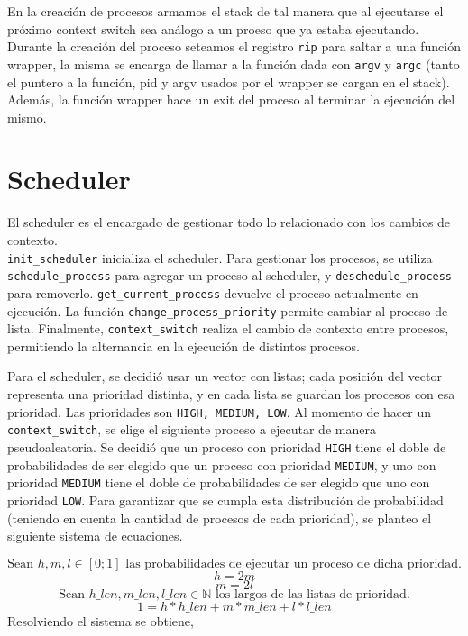 \documentclass{article}
\begin{document}
En la creación de procesos armamos el stack de tal manera que al ejecutarse el próximo context switch sea análogo a un proeso que ya estaba ejecutando. Durante la creación del proceso seteamos el registro \texttt{rip} para saltar a una función wrapper, la misma se encarga de llamar a la función dada con \texttt{argv} y \texttt{argc} (tanto el puntero a la función, pid y argv usados por el wrapper se cargan en el stack). Además, la función wrapper hace un exit del proceso al terminar la ejecución del mismo.

\section {Scheduler}
El scheduler es el encargado de gestionar todo lo relacionado con los cambios de contexto. \\ \texttt{init\_scheduler} inicializa el scheduler. Para gestionar los procesos, se utiliza \texttt{schedule\_process} para agregar un proceso al scheduler, y \texttt{deschedule\_process} para removerlo. \texttt{get\_current\_process} devuelve el proceso actualmente en ejecución. La función \texttt{change\_process\_priority} permite cambiar al proceso de lista. Finalmente, \texttt{context\_switch} realiza el cambio de contexto entre procesos, permitiendo la alternancia en la ejecución de distintos procesos.

Para el scheduler, se decidió usar un vector con listas; cada posición del vector representa una prioridad distinta, y en cada lista se guardan los procesos con esa prioridad. Las prioridades son \texttt{HIGH, MEDIUM, LOW}.
Al momento de hacer un \texttt{context\_switch}, se elige el siguiente proceso a ejecutar de manera pseudoaleatoria. Se decidió que un proceso con prioridad \texttt{HIGH} tiene el doble de probabilidades de ser elegido que un proceso con prioridad \texttt{MEDIUM}, y uno con prioridad \texttt{MEDIUM} tiene el doble de probabilidades de ser elegido que uno con prioridad \texttt{LOW}. Para garantizar que se cumpla esta distribución de probabilidad (teniendo en cuenta la cantidad de procesos de cada prioridad), se planteo el siguiente sistema de ecuaciones.

\begin{equation*}
\text{Sean } h, m, l \in [0; 1] \text{ las probabilidades de ejecutar un proceso de dicha prioridad.}
\end{equation*}
\begin{equation*}
h = 2m
\end{equation*}
\begin{equation*}
m = 2l
\end{equation*}
\begin{equation*}
\text{Sean } h\_len, m\_len, l\_len \in \mathbb{N} \text{ los largos de las listas de prioridad.}
\end{equation*}
\begin{equation*}
1 = h * h\_len + m * m\_len + l * l\_len
\end{equation*}
Resolviendo el sistema se obtiene,
\end{document}
